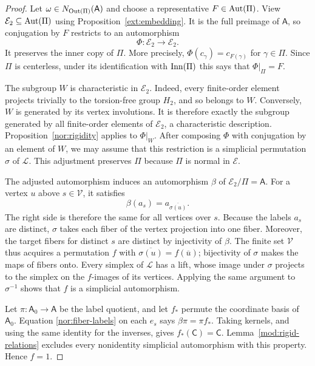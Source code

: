 \begin{proof}
Let $\omega\in N_{\operatorname{Out}(\Pi)}(\mathsf A)$ and choose a
representative $F\in\operatorname{Aut}(\Pi)$.  View
$\mathcal E_2\subseteq\operatorname{Aut}(\Pi)$ using
Proposition~\ref{ext:embedding}.  It is the full preimage
of $\mathsf A$, so conjugation by $F$ restricts to an
automorphism
\[
 \Phi\colon\mathcal E_2\longrightarrow\mathcal E_2.
\]
It preserves the inner copy of $\Pi$.  More precisely,
$\Phi(c_\gamma)=c_{F(\gamma)}$ for $\gamma\in\Pi$.
Since $\Pi$ is centerless, under its identification with
$\operatorname{Inn}(\Pi)$ this says that $\Phi|_\Pi=F$.

The subgroup $W$ is characteristic in $\mathcal E_2$.
Indeed, every finite-order element projects trivially to the
torsion-free group $H_2$, and so belongs to $W$.  Conversely,
$W$ is generated by its vertex involutions.  It is therefore
exactly the subgroup generated by all finite-order elements
of $\mathcal E_2$, a characteristic description.
Proposition~\ref{nor:rigidity} applies to $\Phi|_W$.
After composing $\Phi$ with conjugation by an element of
$W$, we may assume that this restriction is a simplicial
permutation $\sigma$ of $\widehat{\mathcal L}$.  This
adjustment preserves $\Pi$ because $\Pi$ is normal in
$\mathcal E$.

The adjusted automorphism induces an automorphism $\beta$
of $\mathcal E_2/\Pi=\mathsf A$.  For a vertex $u$ above
$s\in\mathcal V$, it satisfies
\begin{equation}\label{nor:fiber-labels}
 \beta(a_s)=a_{\overline{\sigma(u)}}.
\end{equation}
The right side is therefore the same for all vertices over
$s$.  Because the labels $a_s$ are distinct, $\sigma$ takes
each fiber of the vertex projection into one fiber.
Moreover, the target fibers for distinct $s$ are distinct
by injectivity of $\beta$.  The finite set $\mathcal V$
thus acquires a permutation $f$ with
$\overline{\sigma(u)}=f(\overline u)$; bijectivity of
$\sigma$ makes the maps of fibers onto.  Every simplex of
$\mathcal L$ has a lift, whose image under $\sigma$ projects
to the simplex on the $f$-images of its vertices.  Applying
the same argument to $\sigma^{-1}$ shows that $f$ is a
simplicial automorphism.

Let $\pi\colon\mathsf A_0\to\mathsf A$ be the label quotient,
and let $f_*$ permute the coordinate basis of $\mathsf A_0$.
Equation \eqref{nor:fiber-labels} on each $e_s$ says
$\beta\pi=\pi f_*$.  Taking kernels, and using the same
identity for the inverses, gives
$f_*(\mathsf C)=\mathsf C$.  Lemma~\ref{mod:rigid-relations} excludes
every nonidentity simplicial automorphism with this property.  Hence $f=1$.


\end{proof}
